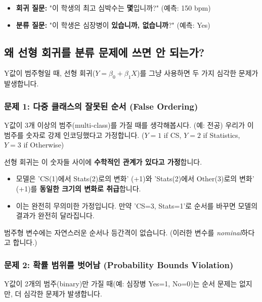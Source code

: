 \documentclass[11pt,a4paper]{book}
\theoremstyle{definition}
\begin{document}
\begin{examplebox}[title=회귀 질문 vs. 분류 질문]
    \begin{itemize}
        \item \textbf{회귀 질문:} "이 학생의 최고 심박수는 \textbf{몇}입니까?" (예측: 150 bpm)
        \item \textbf{분류 질문:} "이 학생은 심장병이 \textbf{있습니까, 없습니까}?" (예측: Yes)
    \end{itemize}
\end{examplebox}

\subsection{왜 선형 회귀를 분류 문제에 쓰면 안 되는가?}

Y값이 범주형일 때, 선형 회귀($Y = \beta_0 + \beta_1 X$)를 그냥 사용하면 두 가지 심각한 문제가 발생합니다.

\subsubsection{문제 1: 다중 클래스의 잘못된 순서 (False Ordering)}

Y값이 3개 이상의 범주(multi-class)를 가질 때를 생각해봅시다. (예: 전공)
우리가 이 범주를 숫자로 강제 인코딩했다고 가정합니다.
($Y = 1$ if CS, $Y = 2$ if Statistics, $Y = 3$ if Otherwise)

\begin{warningbox}
선형 회귀는 이 숫자들 사이에 \textbf{수학적인 관계가 있다고 가정}합니다.
\begin{itemize}
    \item 모델은 'CS(1)에서 Stats(2)로의 변화' (+1)와 'Stats(2)에서 Other(3)로의 변화' (+1)를 \textbf{동일한 크기의 변화로 취급}합니다.
    \item 이는 완전히 무의미한 가정입니다. 만약 'CS=3, Stats=1'로 순서를 바꾸면 모델의 결과가 완전히 달라집니다.
\end{itemize}
범주형 변수에는 자연스러운 순서나 등간격이 없습니다. (이러한 변수를 \textit{nominal}하다고 합니다.)
\end{warningbox}

\subsubsection{문제 2: 확률 범위를 벗어남 (Probability Bounds Violation)}

Y값이 2개의 범주(binary)만 가질 때(예: 심장병 Yes=1, No=0)는 순서 문제는 없지만, 더 심각한 문제가 발생합니다.
\end{document}
